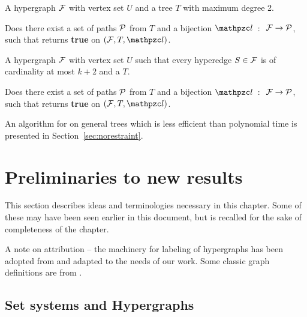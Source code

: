 \begin{problemdef}{\CFTPLINT}{ A hypergraph ${\cal F}$ with vertex set $U$
    and a tree $T$ with maximum degree 2.}

  Does there exist a set of paths ${\cal P}$ from $T$ and a bijection
  $\cl$~$:$~${\cal F} \rightarrow {\cal P}$, such that {\FTPL} returns {\bf
    true} on $(\cF, T, \cl)$.  
\end{problemdef}

\begin{problemdef}{\CFTPLKTREE}{A hypergraph ${\cal F}$ with vertex set $U$
    such that every hyperedge $S \in {\cal F}$ is of cardinality at most
    $k+2$ and a {\kstar} $T$.}

  Does there exist a set of paths ${\cal P}$ from $T$ and a bijection
  $\cl$~$:$~${\cal F} \rightarrow {\cal P}$, such that {\FTPL} returns {\bf
    true} on $(\cF, T, \cl)$.
\end{problemdef}


An algorithm for \CFTPL on general trees which is less efficient than
polynomial time is presented in
Section~\ref{sec:norestraint}. 

\section[Preliminaries]{Preliminaries to new results}
\label{ch:prelims}

This section describes ideas and terminologies necessary in this
chapter. Some of these may have been seen earlier in this document,
but is recalled for the sake of completeness of the chapter.  

A note on attribution -- the machinery for labeling of hypergraphs
has been adopted from \cite{kklv10} and adapted to the needs of our
work. Some classic graph definitions are from \cite{mcg04}.

\subsection{Set systems and Hypergraphs}
\label{sec:setsyshypergraph}

